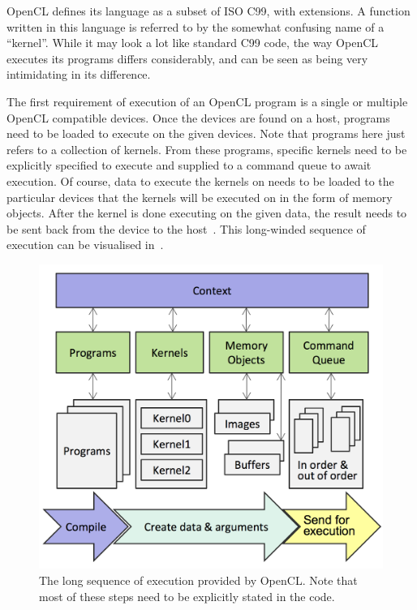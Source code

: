 \documentclass[a4paper,11pt]{article}
\begin{document}
OpenCL defines its language as a subset of ISO C99, with extensions. A function written in this language is referred
to by the somewhat confusing name of a ``kernel''. While it may look a lot like standard C99 code, the way OpenCL executes
its programs differs considerably, and can be seen as being very intimidating in its difference.

The first requirement of execution of an OpenCL program is a single or multiple OpenCL compatible devices. Once the devices
are found on a host, programs need to be loaded to execute on the given devices. Note that programs here just refers to
a collection of kernels. From these programs, specific kernels need to be explicitly specified to execute and supplied to
a command queue to await execution. Of course, data to execute the kernels on needs to be loaded to the particular devices
that the kernels will be executed on in the form of memory objects. After the kernel is done executing on the given data,
the result needs to be sent back from the device to the host~\cite{slides:KhronosOpenCLOverview}. This long-winded sequence of execution can be visualised
in~.

\begin{figure}[ht]
  \centering
  \includegraphics[scale=0.5]{img/opencl-execution}
  \caption{The long sequence of execution provided by OpenCL. Note that most of these steps need to be explicitly stated
  in the code.~\cite{slides:KhronosOpenCLOverview}}
\label{fig:opencl-execution}
\end{figure}
\end{document}
